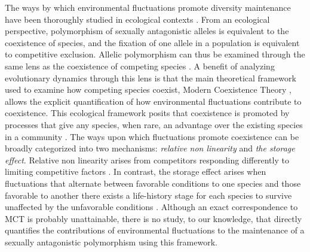 \documentclass[12pt]{article}
\begin{document}
The ways by which environmental fluctuations promote diversity maintenance have been thoroughly studied in ecological contexts \citep{levins1979coexistence,armstrong1980competitive,chesson2000general,barabas_chessons_2018}. From an ecological perspective, polymorphism of sexually antagonistic alleles is equivalent to the coexistence of species, and the fixation of one allele in a population is equivalent to competitive exclusion. Allelic polymorphism can thus be examined through the same lens as the coexistence of competing species \citep{ellner1994role,ellner1996patterns,dean2005protecting,schreiber2010interactive}. A benefit of analyzing evolutionary dynamics through this lens is that the main theoretical framework used to examine how competing species coexist, Modern Coexistence Theory \citep{Chesson2000, barabas_chessons_2018}, allows the explicit quantification of how environmental fluctuations contribute to coexistence. This ecological framework posits that coexistence is promoted by processes that give any species, when rare, an advantage over the existing species in a community \citep{chesson1994multispecies,Chesson2000}. The ways upon which fluctuations promote coexistence can be broadly categorized into two mechanisms: \textit{relative non linearity} and \textit{the storage effect}. Relative non linearity arises from competitors responding differently to limiting competitive factors \citep{chesson2000general,ellner2016quantify,zepeda2019fluctuation}. In contrast, the storage effect arises when fluctuations that alternate between favorable conditions to one species and those favorable to another there exists a life-history stage for each species to survive unaffected by the unfavorable conditions \citep{Chesson2000,ellner2016quantify,barabas_chessons_2018,schreiber2021positively}. Although an exact correspondence to MCT is probably unattainable, there is no study, to our knowledge, that directly quantifies the contributions of environmental fluctuations to the maintenance of a sexually antagonistic polymorphism using this framework.

\end{document}
